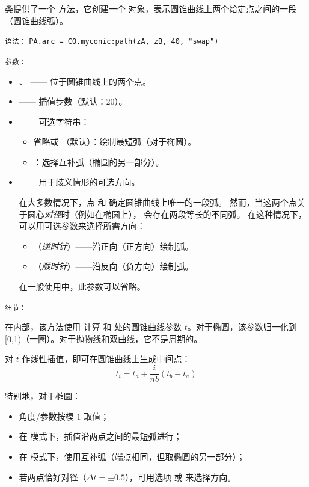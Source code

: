  类提供了一个  方法，它创建一个
 对象，表示圆锥曲线上两个给定点之间的一段（圆锥曲线弧）。

\medskip
\texttt{语法：}
\verb|PA.arc = CO.myconic:path(zA, zB, 40, "swap")|

\texttt{参数：}

\begin{itemize}
  \item {}、 —— 位于圆锥曲线上的两个点。
  \item {} —— 插值步数（默认：20）。
  \item {} —— 可选字符串：
  \begin{itemize}
      \item 省略或 （默认）：绘制最短弧（对于椭圆）。
      \item {}：选择互补弧（椭圆的另一部分）。
  \end{itemize}
  \item {} —— 用于歧义情形的可选方向。

        在大多数情况下，点  和  确定圆锥曲线上唯一的一段弧。
        然而，当这两个点关于圆心\emph{对径}时（例如在椭圆上），
        会存在两段等长的不同弧。
        在这种情况下，可以用可选参数来选择所需方向：

        \begin{itemize}
          \item {}（\emph{逆时针}）——沿正向（正方向）绘制弧。
          \item {}（\emph{顺时针}）——沿反向（负方向）绘制弧。
        \end{itemize}

   在一般使用中，此参数可以省略。
\end{itemize}

\medskip
\texttt{细节：}

在内部，该方法使用  计算  和  处的圆锥曲线参数 $t$。对于椭圆，该参数归一化到 [0,1)（一圈）。对于抛物线和双曲线，它不是周期的。

对 $t$ 作线性插值，即可在圆锥曲线上生成中间点：
\[
t_i = t_a + \frac{i}{nb}(t_b - t_a)
\]

特别地，对于椭圆：
\begin{itemize}
  \item 角度/参数按模 $1$ 取值；
  \item 在  模式下，插值沿两点之间的最短弧进行；
  \item 在  模式下，使用互补弧（端点相同，但取椭圆的另一部分）；
  \item 若两点恰好对径（$\Delta t = \pm 0.5$），可用选项
         或  来选择方向。
\end{itemize}

